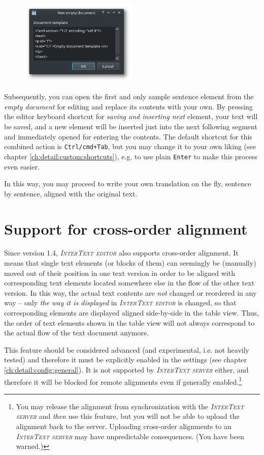 \documentclass[a4paper,10pt,oneside]{book}
\newcommand{\ITeditor}{\textit{\textsc{InterText editor}}\xspace}
\newcommand{\ITserver}{\textit{\textsc{InterText server}}\xspace}
\newcommand{\keys}[1]{\texttt{#1}}
\begin{document}
\begin{figure}[htb]
 \includegraphics[width=0.5\textwidth]{screenshots/empty_doc_template.png}
\end{figure}

Subsequently, you can open the first and only sample sentence element from the \emph{empty document} for editing and replace its contents with your own. By pressing the editor keyboard shortcut for \emph{saving and inserting next} element, your text will be saved, and a new element will be inserted just into the next following segment and immediately opened for entering the contents. The default shortcut for this combined action is \keys{Ctrl/cmd+Tab}, but you may change it to your own liking (see chapter \ref{ch:detail:custom:shortcuts}), e.g. to use plain \keys{Enter} to make this process even easier.

In this way, you may proceed to write your own translation on the fly, sentence by sentence, aligned with the original text.

\chapter{Support for cross-order alignment}\label{ch:detail:crossorder}

Since version 1.4, \ITeditor also supports cross-order alignment. It means that single text elements (or blocks of them) can seemingly be (manually) moved out of their position in one text version in order to be aligned with corresponding text elements located somewhere else in the flow of the other text version. In this way, the actual text contents are \emph{not} changed or reordered in any way -- only \emph{the way it is displayed} in \ITeditor is changed, so that corresponding elements are displayed aligned side-by-side in the table view. Thus, the order of text elements shown in the table view will not always correspond to the actual flow of the text document anymore.

This feature should be considered advanced (and experimental, i.e. not heavily tested) and therefore it must be explicitly enabled in the settings (see chapter \ref{ch:detail:config:general}). It is not supported by \ITserver either, and therefore it will be blocked for remote alignments even if generally enabled.\footnote{You may release the alignment from synchronization with the \ITserver and \emph{then} use this feature, but you will not be able to upload the alignment back to the server. Uploading cross-order alignments to an \ITserver may have unpredictable consequences. (You have been warned.)}
\end{document}
